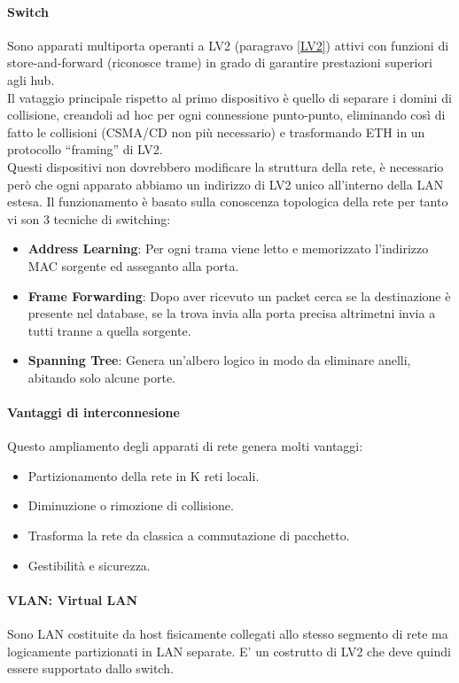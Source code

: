 \documentclass[12pt]{article}
\begin{document}
\paragraph{Switch}
Sono apparati multiporta operanti a LV2 (paragravo \ref{LV2}) attivi con funzioni di store-and-forward (riconosce trame) in grado di garantire prestazioni superiori agli hub.\\
Il vataggio principale rispetto al primo dispositivo è quello di separare i domini di collisione, creandoli ad hoc per ogni connessione punto-punto, eliminando così di fatto le collisioni (CSMA/CD non più necessario) e trasformando ETH in un protocollo ``framing'' di LV2.\\
Questi dispositivi non dovrebbero modificare la struttura della rete, è necessario però che ogni apparato abbiamo un indirizzo di LV2 unico all'interno della LAN estesa. Il funzionamento è basato sulla conoscenza topologica della rete per tanto vi son 3 tecniche di switching:
\begin{itemize}
  \item \textbf{Address Learning}: Per ogni trama viene letto e memorizzato l'indirizzo MAC sorgente ed asseganto alla porta.
  \item \textbf{Frame Forwarding}: Dopo aver ricevuto un packet cerca se la destinazione è presente nel database, se la trova invia alla porta precisa altrimetni invia a tutti tranne a quella sorgente.
  \item \textbf{Spanning Tree}: Genera un'albero logico in modo da eliminare anelli, abitando solo alcune porte.
\end{itemize}
\paragraph{Vantaggi di interconnesione}
Questo ampliamento degli apparati di rete genera molti vantaggi:
\begin{itemize}
  \item Partizionamento della rete in K reti locali.
  \item Diminuzione o rimozione di collisione.
  \item Trasforma la rete da classica a commutazione di pacchetto.
  \item Gestibilità e sicurezza.
\end{itemize}
\paragraph{VLAN: Virtual LAN}
Sono LAN costituite da host fisicamente collegati allo stesso segmento di rete ma logicamente partizionati in LAN separate. E' un costrutto di LV2 che deve quindi essere supportato dallo switch.
\end{document}
